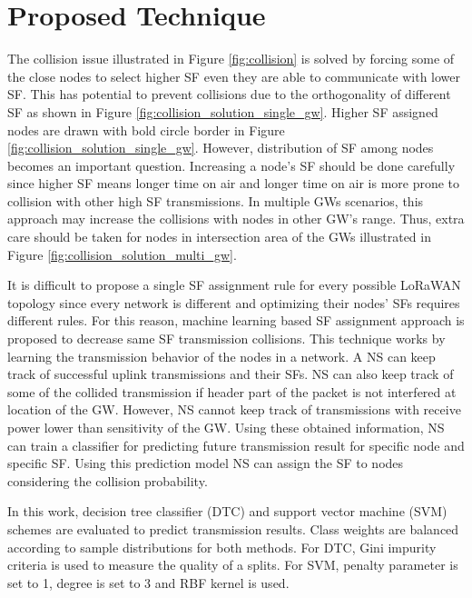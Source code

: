 \documentclass[conference]{IEEEtran}
\begin{document}
\section{Proposed Technique} \label{Proposed Technique}
\par The collision issue illustrated in Figure \ref{fig:collision} is solved by forcing some of the close nodes to select higher SF even they are able to communicate with lower SF. This has potential to prevent collisions due to the orthogonality of different SF as shown in Figure \ref{fig:collision_solution_single_gw}. Higher SF assigned nodes are drawn with bold circle border in Figure \ref{fig:collision_solution_single_gw}. However, distribution of SF among nodes becomes an important question. Increasing a node's SF should be done carefully since higher SF means longer time on air and longer time on air is more prone to collision with other high SF transmissions. In multiple GWs scenarios, this approach may increase the collisions with nodes in other GW's range. Thus, extra care should be taken for nodes in intersection area of the GWs illustrated in Figure \ref{fig:collision_solution_multi_gw}.

\par It is difficult to propose a single SF assignment rule for every possible LoRaWAN topology since every network is different and optimizing their nodes' SFs requires different rules. For this reason, machine learning based SF assignment approach is proposed to decrease same SF transmission collisions. This technique works by learning the transmission behavior of the nodes in a network. A NS can keep track of successful uplink transmissions and their SFs. NS can also keep track of some of the collided transmission if header part of the packet is not interfered at location of the GW. However, NS cannot keep track of transmissions with receive power lower than sensitivity of the GW. Using these obtained information, NS can train a classifier for predicting future transmission result for specific node and specific SF. Using this prediction model NS can assign the SF to nodes considering the collision probability.

\par In this work, decision tree classifier (DTC) and support vector machine (SVM) schemes are evaluated to predict transmission results. Class weights are balanced according to sample distributions for both methods. For DTC, Gini impurity criteria is used to measure the quality of a splits. For SVM, penalty parameter is set to 1, degree is set to 3 and RBF kernel is used.
\end{document}
